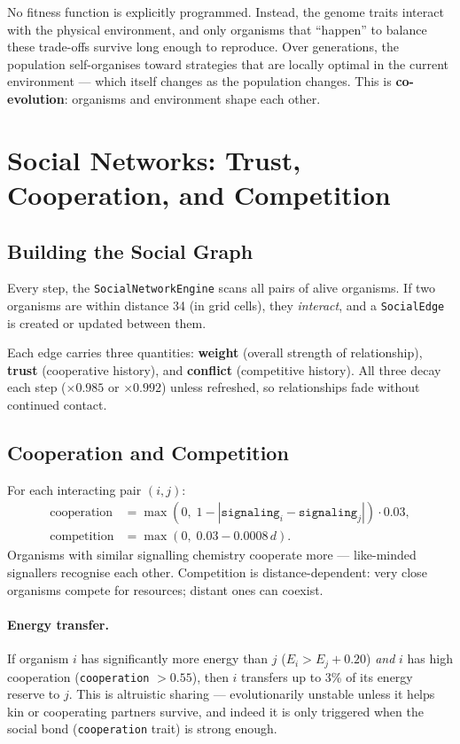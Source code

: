 \documentclass[12pt,a4paper]{article}
\begin{document}
No fitness function is explicitly programmed.
Instead, the genome traits interact with the physical environment,
and only organisms that ``happen'' to balance these trade-offs
survive long enough to reproduce.
Over generations, the population self-organises toward strategies
that are locally optimal in the current environment —
which itself changes as the population changes.
This is \textbf{co-evolution}: organisms and environment
shape each other.

\section{Social Networks: Trust, Cooperation, and Competition}
\label{sec:social}

\subsection{Building the Social Graph}

Every step, the \texttt{SocialNetworkEngine}
scans all pairs of alive organisms.
If two organisms are within distance 34 (in grid cells), they
\emph{interact}, and a \texttt{SocialEdge} is created or updated
between them.

Each edge carries three quantities:
\textbf{weight} (overall strength of relationship),
\textbf{trust} (cooperative history),
and \textbf{conflict} (competitive history).
All three decay each step ($\times 0.985$ or $\times 0.992$)
unless refreshed, so relationships fade without continued contact.

\subsection{Cooperation and Competition}

For each interacting pair $(i, j)$:
\begin{align}
  \text{cooperation} &= \max(0,\;
    1 - |\texttt{signaling}_i - \texttt{signaling}_j|)\cdot 0.03, \\
  \text{competition} &= \max(0,\;0.03 - 0.0008\,d).
\end{align}
Organisms with similar signalling chemistry cooperate more —
like-minded signallers recognise each other.
Competition is distance-dependent: very close organisms compete
for resources; distant ones can coexist.

\paragraph{Energy transfer.}
If organism $i$ has significantly more energy than $j$
($E_i > E_j + 0.20$) \emph{and} $i$ has high cooperation
(\texttt{cooperation} $> 0.55$), then $i$ transfers up to 3\%
of its energy reserve to $j$.
This is altruistic sharing — evolutionarily unstable
unless it helps kin or cooperating partners survive,
and indeed it is only triggered when the social
bond (\texttt{cooperation} trait) is strong enough.
\end{document}
